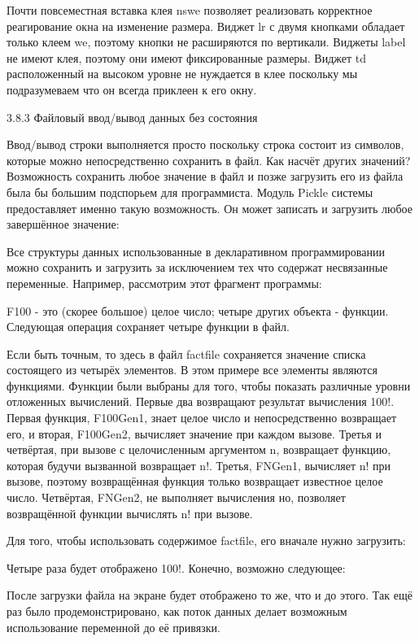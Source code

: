 Почти повсеместная вставка клея nswe позволяет реализовать корректное реагирование окна на изменение размера. Виджет lr с двумя кнопками обладает только клеем we, поэтому кнопки не расширяются по вертикали. Виджеты label не имеют клея, поэтому они имеют фиксированные размеры. Виджет td расположенный на высоком уровне не нуждается в клее поскольку мы подразумеваем что он всегда приклеен к его окну.

3.8.3 Файловый ввод/вывод данных без состояния

Ввод/вывод строки выполняется просто поскольку строка состоит из символов, которые можно непосредственно сохранить в файл. Как насчёт других значений? Возможность сохранить любое значение в файл и позже загрузить его из файла была бы большим подспорьем для программиста. Модуль Pickle системы предоставляет именно такую возможность. Он может записать и загрузить любое завершённое значение:

Все структуры данных использованные в декларативном программировании можно сохранить и загрузить за исключением тех что содержат несвязанные переменные. Например, рассмотрим этот фрагмент программы:

F100 - это (скорее большое) целое число; четыре других объекта - функции. Следующая операция сохраняет четыре функции в файл.

Если быть точным, то здесь в файл factfile сохраняется значение списка состоящего из четырёх элементов. В этом примере все элементы являются функциями. Функции были выбраны для того, чтобы показать различные уровни отложенных вычислений. Первые два возвращают результат вычисления 100!. Первая функция, F100Gen1, знает целое число и непосредственно возвращает его, и вторая, F100Gen2, вычисляет значение при каждом вызове. Третья и четвёртая, при вызове с целочисленным аргументом n, возвращает функцию, которая будучи вызванной возвращает n!. Третья, FNGen1, вычисляет n! при вызове, поэтому возвращённая функция только возвращает известное целое число. Четвёртая, FNGen2, не выполняет вычисления но, позволяет возвращённой функции вычислять n! при вызове.

Для того, чтобы использовать содержимое factfile, его вначале нужно загрузить:

Четыре раза будет отображено 100!. Конечно, возможно следующее:

После загрузки файла на экране будет отображено то же, что и до этого. Так ещё раз было продемонстрировано, как поток данных делает возможным использование переменной до её привязки.

